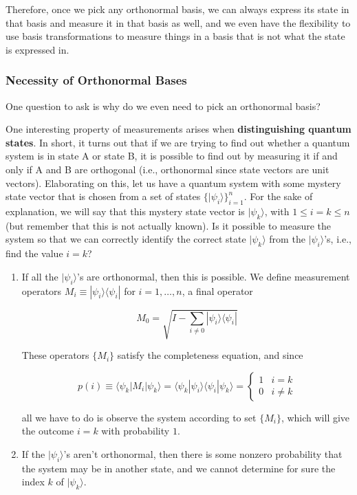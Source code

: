 \documentclass{article}
\theoremstyle{definition}
\begin{document}
    Therefore, once we pick any orthonormal basis, we can always express its state in that basis and measure it in that basis as well, and we even have the flexibility to use basis transformations to measure things in a basis that is not what the state is expressed in. 

    \subsubsection{Necessity of Orthonormal Bases} 

      One question to ask is why do we even need to pick an orthonormal basis? 

      One interesting property of measurements arises when \textbf{distinguishing quantum states}. In short, it turns out that if we are trying to find out whether a quantum system is in state A or state B, it is possible to find out by measuring it if and only if A and B are orthogonal (i.e., orthonormal since state vectors are unit vectors). Elaborating on this, let us have a quantum system with some mystery state vector that is chosen from a set of states $\{|\psi_i \rangle \}_{i=1}^n$. For the sake of explanation, we will say that this mystery state vector is $|\psi_k \rangle$, with $1 \leq i = k \leq n$ (but remember that this is not actually known). Is it possible to measure the system so that we can correctly identify the correct state $|\psi_k \rangle$ from the $|\psi_i\rangle$'s, i.e., find the value $i=k$?

      \begin{enumerate}
        \item If all the $|\psi_i \rangle$'s are orthonormal, then this is possible. We define measurement operators $M_i \equiv |\psi_i \rangle \langle \psi_i |$ for $i = 1, \ldots, n$, a final operator

          \[M_0 = \sqrt{I - \sum_{i\neq 0} |\psi_i \rangle \langle \psi_i |}\]

        These operators $\{M_i\}$ satisfy the completeness equation, and since

          \[p(i) \equiv \langle \psi_k | M_i | \psi_k \rangle = \langle \psi_k | \psi_i \rangle \langle \psi_i | \psi_k \rangle = \begin{cases} 1 & i = k \\ 0 & i \neq k \end{cases}\]

        all we have to do is observe the system according to set $\{M_i\}$, which will give the outcome $i=k$ with probability $1$.

        \item If the $|\psi_i\rangle$'s aren't orthonormal, then there is some nonzero probability that the system may be in another state, and we cannot determine for sure the index $k$ of $|\psi_k \rangle$.
      \end{enumerate}
\end{document}
